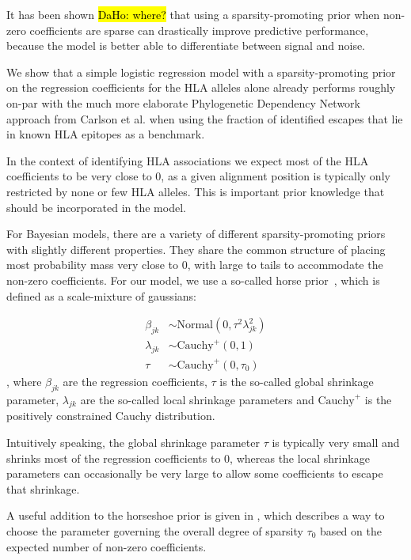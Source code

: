 \documentclass{bioinfo}
\begin{document}
\begin{methods}
  It has been shown \hl{DaHo: where?} that using a sparsity-promoting prior when non-zero coefficients are sparse can drastically improve predictive performance, because the model is better able to differentiate between signal and noise.

  We show that a simple logistic regression model with a sparsity-promoting prior on the regression coefficients for the HLA alleles alone already performs roughly on-par  with the much more elaborate Phylogenetic Dependency Network approach from Carlson et al. when using the fraction of identified escapes that lie in known HLA epitopes as a benchmark.

In the context of identifying HLA associations we expect most of the HLA coefficients to be very close to 0, as a given alignment position is typically only restricted by none or few HLA alleles.
This is important prior knowledge that should be incorporated in the model.

For Bayesian models, there are a variety of different sparsity-promoting priors with slightly different properties. They share the common structure of placing most probability mass very close to 0, with large to tails to accommodate the non-zero coefficients.
For our model, we use a so-called horse prior~\citep{Carvalho2010}, which is defined as a scale-mixture of gaussians:

\begin{equation}
  \begin{aligned}
    \beta_{jk} &\sim \text{Normal}(0, \tau^{2}\lambda^{2}_{jk}) \\
    \lambda_{jk} &\sim \text{Cauchy}^{+}(0, 1) \\
    \tau &\sim \text{Cauchy}^{+}(0, \tau_{0})
  \end{aligned}
\end{equation},
where \(\beta_{jk}\) are the regression coefficients, \(\tau\) is the so-called global shrinkage parameter, \(\lambda_{jk}\) are the so-called local shrinkage parameters and \(\text{Cauchy}^{+}\) is the positively constrained Cauchy distribution.

Intuitively speaking, the global shrinkage parameter \(\tau\) is typically very small and shrinks most of the regression coefficients to 0, whereas the local shrinkage parameters can occasionally be very large to allow some coefficients to escape that shrinkage.

A useful addition to the horseshoe prior is given in \citet{Piironen2017}, which describes a way to choose the parameter governing the overall degree of sparsity \(\tau_{0}\) based on the expected number of non-zero coefficients. 


\end{methods}
\end{document}
